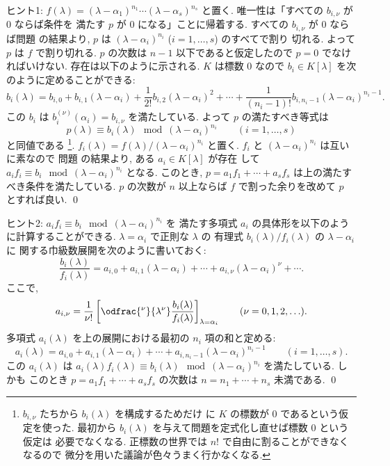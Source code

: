 \documentclass[12pt,twoside]{jarticle}
\begin{document}
\noindent
ヒント1: $f(\lambda)=(\lambda-\alpha_1)^{n_1}\cdots(\lambda-\alpha_s)^{n_s}$ 
と置く.  唯一性は「すべての $b_{i,\nu}$ が $0$ ならば条件を
満たす $p$ が $0$ になる」ことに帰着する.  
すべての $b_{i,\nu}$ が $0$ ならば問題  
の結果より, $p$ は $(\lambda-\alpha_i)^{n_i}$ ($i=1,\dots,s$) のすべてで割り
切れる.  よって $p$ は $f$ で割り切れる.
$p$ の次数は $n-1$ 以下であると仮定したので $p=0$ でなければいけない.
存在は以下のように示される.  $K$ は標数 $0$ なので $b_i\in K[\lambda]$ を次
のように定めることができる:
\begin{equation*}
  b_i(\lambda) =
  b_{i,0} + b_{i,1}(\lambda-\alpha_i) 
  + \frac{1}{2!}b_{i,2}(\lambda-\alpha_i)^2 +
  \cdots + \frac{1}{(n_i-1)!}b_{i,n_i-1}(\lambda-\alpha_i)^{n_i-1}.
\end{equation*}
この $b_i$ は $b_i^{(\nu)}(\alpha_i)=b_{i,\nu}$ を満たしている.
よって $p$ の満たすべき等式は
\begin{equation*}
  p(\lambda) \equiv b_i(\lambda) \mod{(\lambda-\alpha_i)^{n_i}}
  \qquad (i=1,\dots,s)
\end{equation*}
と同値である%
\footnote{$b_{i,\nu}$ たちから $b_i(\lambda)$ を構成するためだけ
  に $K$ の標数が $0$ であるという仮定を使った.  
  最初から $b_i(\lambda)$ を与えて問題を定式化し直せば標数 $0$ という仮定は
  必要でなくなる.  正標数の世界では $n!$ で自由に割ることができなくなるので
  微分を用いた議論が色々うまく行かなくなる.}.  
$f_i(\lambda)=f(\lambda)/(\lambda-\alpha_i)^{n_i}$ と置く.
$f_i$ と $(\lambda-\alpha_i)^{n_i}$ は互いに素なので
問題  の結果より, 
ある $a_i\in K[\lambda]$ が存在
して $a_if_i\equiv b_i\mod{(\lambda-\alpha_i)^{n_i}}$ となる.
このとき, $p=a_1f_1+\cdots+a_sf_s$ は上の満たすべき条件を満たしている.  
$p$ の次数が $n$ 以上ならば $f$ で割った余りを改めて $p$ とすれば良い.
\qed

\medskip
\noindent
ヒント2: $a_if_i\equiv b_i\mod{(\lambda-\alpha_i)^{n_i}}$ を
満たす多項式 $a_i$ の具体形を以下のように計算することができる.
$\lambda=\alpha_i$ で正則な $\lambda$ の
有理式 $b_i(\lambda)/f_i(\lambda)$ の $\lambda-\alpha_i$ に
関する巾級数展開を次のように書いておく:
\begin{equation*}
  \frac{b_i(\lambda)}{f_i(\lambda)} =
  a_{i,0}+a_{i,1}(\lambda-\alpha_i)+\cdots
  +a_{i,\nu}(\lambda-\alpha_i)^{\nu} + \cdots.
\end{equation*}
ここで, 
\begin{equation*}
  a_{i,\nu} = 
  \frac{1}{\nu !}
  \left[
    \odfrac{^\nu}{\lambda^\nu}
    \frac{b_i(\lambda)}{f_i(\lambda)}
  \right]_{\lambda=\alpha_i}
  \qquad (\nu=0,1,2,\ldots).
\end{equation*}
多項式 $a_i(\lambda)$ を上の展開における最初の $n_i$ 項の和と定める:
\begin{equation*}
  a_i(\lambda) = 
  a_{i,0}+a_{i,1}(\lambda-\alpha_i)+\cdots
  +a_{i,n_i-1}(\lambda-\alpha_i)^{n_i-1}
  \qquad (i=1,\dots,s).
\end{equation*}
この $a_i(\lambda)$ は $
a_i(\lambda)f_i(\lambda) \equiv b_i(\lambda)
\mod (\lambda-\alpha_i)^{n_i}
$ を満たしている. しかも
このとき $p=a_1f_1+\cdots+a_sf_s$ の次数は $n=n_1+\cdots+n_s$ 未満である.
\qed
\end{document}
